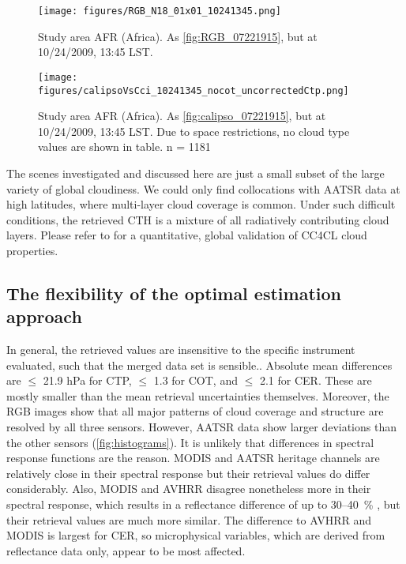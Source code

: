 \begin{figure*}[h]
  \texttt{[image: figures/RGB\_N18\_01x01\_10241345.png]} %
  \caption{Study area AFR (Africa). As \autoref{fig:RGB_07221915}, but at 10/24/2009, 13:45 LST.}
  \label{fig:RGB_10241345}
  \texttt{[image: figures/calipsoVsCci\_10241345\_nocot\_uncorrectedCtp.png]}
  \caption{Study area AFR (Africa). As \autoref{fig:calipso_07221915}, but at 10/24/2009, 13:45 LST. Due to space restrictions, no cloud type values are shown in table. n = 1181} 
  \label{fig:calipso_10241345}
\end{figure*}
The scenes investigated and discussed here are just a small subset of the large variety of global cloudiness. We could only find collocations with AATSR data at high latitudes, where multi-layer cloud coverage is common. Under such difficult conditions, the retrieved CTH is a mixture of all radiatively contributing cloud layers. Please refer to \citet{Stengel17} for a quantitative, global validation of CC4CL cloud properties.
\conclusions[Discussion]\label{discussion}
\subsection{The flexibility of the optimal estimation approach}

In general, the retrieved values are insensitive to the specific instrument evaluated, such that the merged data set is sensible.. Absolute mean differences are $\leq$ 21.9 hPa for CTP, $\leq$ 1.3 for COT, and $\leq$ 2.1 for CER. These are mostly smaller than the mean retrieval uncertainties themselves. Moreover, the RGB images show that all major patterns of cloud coverage and structure are resolved by all three sensors. However, AATSR data show larger deviations than the other sensors (\cref{fig:histograms}). It is unlikely that differences in spectral response functions are the reason. MODIS and AATSR heritage channels are relatively close in their spectral response but their retrieval values do differ considerably. Also, MODIS and AVHRR disagree nonetheless more in their spectral response, which results in a reflectance difference of up to 30--40~\% \citep{Trishchenko02}, but their retrieval values are much more similar. The difference to AVHRR and MODIS is largest for CER, so microphysical variables, which are derived from reflectance data only, appear to be most affected. 

